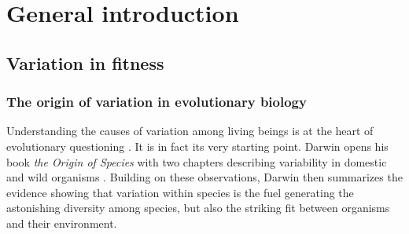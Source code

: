 
\chapter[\texorpdfstring{Chapter 1 \\ General introduction}{Chapter 1 General introduction}]{General introduction}
\label{chap:intro}

\section{Variation in fitness}
\subsection{The origin of variation in evolutionary biology}
Understanding the causes of variation among living beings is at the heart of evolutionary questioning \parencite{Lynch1998, Wayne2006, Kruuk2014}. It is in fact its very starting point. Darwin opens his book \emph{the Origin of Species} with two chapters describing variability in domestic and wild organisms \parencite{Darwin1859}.
Building on these observations, Darwin then summarizes the evidence showing that variation within species is the fuel generating the astonishing diversity among species, but also the striking fit between organisms and their environment.

